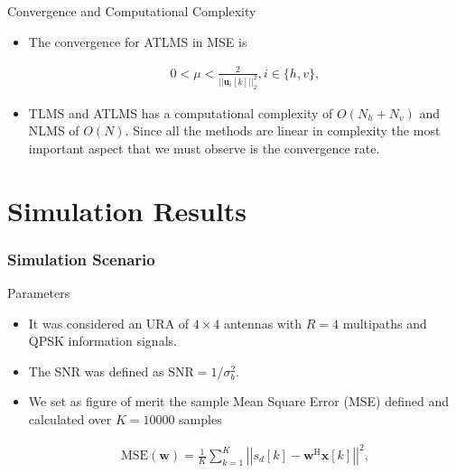 \documentclass[10pt]{beamer}
\begin{document}
\begin{frame}[allowframebreaks]
\begin{block}{Convergence and Computational Complexity}
\begin{itemize}
            \item The convergence for ATLMS in MSE is
            
                \begin{align}
                    0 < \mu < \frac{2}{\left|\left|\boldsymbol{u}_{i}[k]\right|\right|^{2}_{2}}, i \in \{h,v\},
                \end{align}
            
            \item TLMS and ATLMS has a computational complexity of $O(N_{h} + N_{v})$ and NLMS of $O(N)$. Since all the methods are linear in complexity
            the most important aspect that we must observe is the convergence rate.

        \end{itemize}
    \end{block}
\end{frame}

\section{Simulation Results}
\begin{frame}
    \frametitle{Simulation Scenario}
    \begin{block}{Parameters}
        \begin{itemize}
            
            \item It was considered an URA of $4 \times 4$ antennas with $R = 4$ multipaths and QPSK information signals.
            
            \item The SNR was defined as $\text{SNR} = 1/\sigma^{2}_{b}$.

            \item We set as figure of merit the sample Mean Square Error (MSE) defined and calculated over $K = 10000$ samples
            
                \begin{align}
                    \text{MSE}(\boldsymbol{w}) = \frac{1}{K} \sum^{K}_{k = 1} \left|\left| s_{d}[k] - \boldsymbol{w}^{\text{H}} \boldsymbol{x}[k] \right|\right|^{2},
                \end{align}

        \end{itemize}
    \end{block}
\end{frame}
\end{document}
